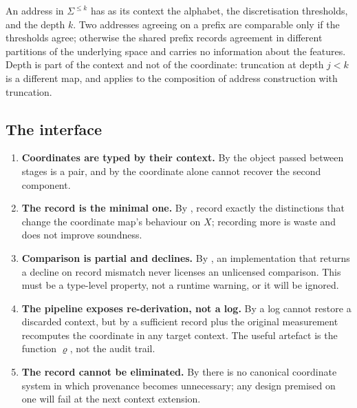 \documentclass[11pt,a4paper]{article}
\theoremstyle{definition}
\theoremstyle{remark}
\begin{document}
An address in $\Sigma^{\leq k}$ has as its context the alphabet, the
discretisation thresholds, and the depth $k$. Two addresses agreeing on a
prefix are comparable only if the thresholds agree; otherwise the shared
prefix records agreement in different partitions of the underlying space
and carries no information about the features. Depth is part of the
context and not of the coordinate: truncation at depth $j < k$ is a
different map, and  applies to the composition of
address construction with truncation.

\subsection{The interface}

\begin{enumerate}[label=(\roman*)]
\item \textbf{Coordinates are typed by their context.} By
 the object passed between stages is a pair, and by
 the coordinate alone cannot recover the second
component.

\item \textbf{The record is the minimal one.} By
, record exactly the distinctions that change
the coordinate map's behaviour on $X$; recording more is waste and does
not improve soundness.

\item \textbf{Comparison is partial and declines.} By
, an implementation that returns a decline on
record mismatch never licenses an unlicensed comparison. This must be a
type-level property, not a runtime warning, or it will be ignored.

\item \textbf{The pipeline exposes re-derivation, not a log.} By
 a log cannot restore a discarded context, but by
 a sufficient record plus the original measurement
recomputes the coordinate in any target context. The useful artefact is
the function $\varrho$, not the audit trail.

\item \textbf{The record cannot be eliminated.} By
 there is no canonical coordinate system in which
provenance becomes unnecessary; any design premised on one will fail at
the next context extension.
\end{enumerate}

\end{document}
